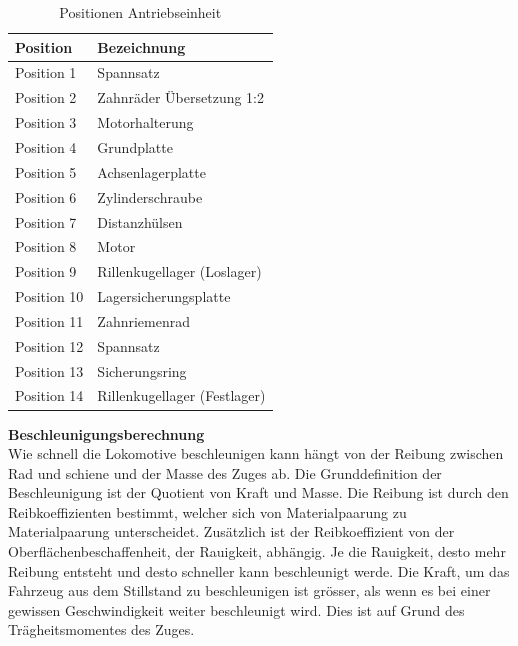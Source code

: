 \documentclass[../../main.tex]{subfiles}
\begin{document}
    \begin{table}[H] \centering
        \begin{tabular}{|l|l|}
        \hline
        \textbf{Position} & \textbf{Bezeichnung}\\
        \hline
        Position 1          & Spannsatz\\
         \hline
        Position 2          & Zahnräder Übersetzung 1:2\\
        \hline
        Position 3          & Motorhalterung\\
        \hline
        Position 4          & Grundplatte\\
        \hline
        Position 5          & Achsenlagerplatte\\
        \hline
        Position 6          & Zylinderschraube\\
        \hline
        Position 7          & Distanzhülsen\\
        \hline
        Position 8          & Motor\\
        \hline
        Position 9          & Rillenkugellager (Loslager)\\
        \hline
        Position 10         & Lagersicherungsplatte\\
        \hline
        Position 11         & Zahnriemenrad\\
        \hline
        Position 12         & Spannsatz\\
        \hline
        Position 13         & Sicherungsring\\
        \hline
        Position 14         & Rillenkugellager (Festlager)\\
        \hline
        \end{tabular}
        
        \caption{Positionen Antriebseinheit}
        \label{tab:pos_antriebseinheit}
        \end{table}
    
    \newpage

    \textbf{Beschleunigungsberechnung}\\
    Wie schnell die Lokomotive beschleunigen kann hängt von der Reibung zwischen Rad und schiene und der Masse des Zuges ab. Die Grunddefinition der Beschleunigung ist der Quotient von Kraft und Masse. Die Reibung ist durch den Reibkoeffizienten bestimmt, welcher sich von Materialpaarung zu Materialpaarung unterscheidet. Zusätzlich ist der Reibkoeffizient von der Oberflächenbeschaffenheit, der Rauigkeit, abhängig. Je die Rauigkeit, desto mehr Reibung entsteht und desto schneller kann beschleunigt werde. Die Kraft, um das Fahrzeug aus dem Stillstand zu beschleunigen ist grösser, als wenn es bei einer gewissen Geschwindigkeit weiter beschleunigt wird. Dies ist auf Grund des Trägheitsmomentes des Zuges. \\
\end{document}
